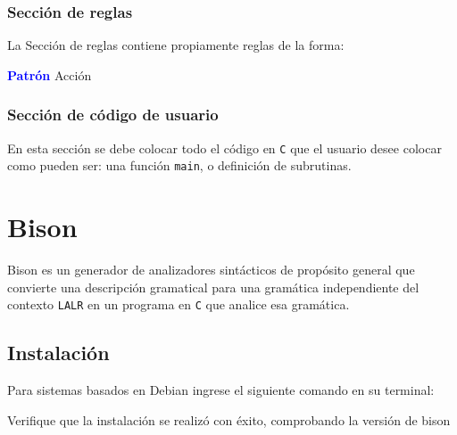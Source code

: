 \documentclass[spanish]{article}
\begin{document}
\subsubsection{Sección de reglas}
La Sección de reglas contiene propiamente reglas de la forma:
\begin{center}
\textcolor{Blue}{{\ttfamily \textbf{Patrón}}} {\ttfamily Acción}
\end{center}
\subsubsection{Sección de código de usuario}
En esta sección se debe colocar todo el código en \texttt{C} que el usuario desee colocar como pueden ser: una función \texttt{main}, o definición de subrutinas.

\section{Bison}
Bison es un generador de analizadores sintácticos de propósito general que convierte una descripción gramatical para una gramática independiente del contexto \texttt{LALR} en un programa en \texttt{C} que analice esa gramática. 

\subsection{Instalación}
Para sistemas basados en Debian ingrese el siguiente comando en su terminal:

\begin{center}
\end{center}

Verifique que la instalación se realizó con éxito, comprobando la versión de bison

\begin{center}
\end{center}
\end{document}
